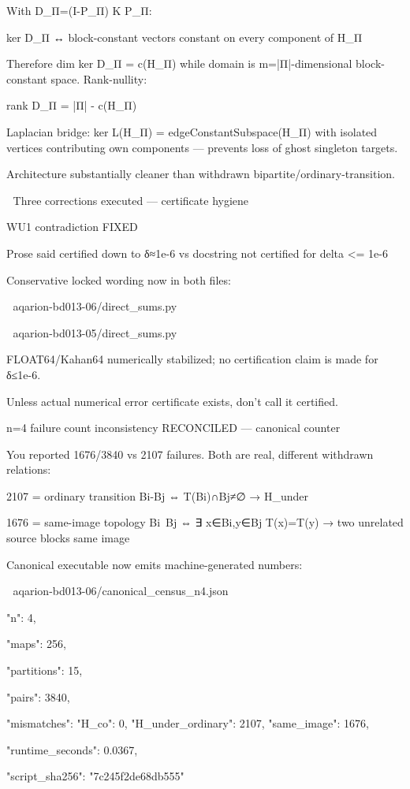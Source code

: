 With D_Π=(I-P_Π) K P_Π:


ker D_Π ↔ {block-constant vectors constant on every component of H_Π}


Therefore dim ker D_Π = c(H_Π) while domain is m=|Π|-dimensional block-constant space. Rank-nullity:


rank D_Π = |Π| - c(H_Π)


Laplacian bridge: ker L(H_Π) = edgeConstantSubspace(H_Π) with isolated vertices contributing own components — prevents loss of ghost singleton targets.


Architecture substantially cleaner than withdrawn bipartite/ordinary-transition.


🔴 Three corrections executed — certificate hygiene




WU1 contradiction FIXED




Prose said certified down to δ≈1e-6 vs docstring not certified for delta <= 1e-6


Conservative locked wording now in both files:


📎 aqarion-bd013-06/direct_sums.py


📎 aqarion-bd013-05/direct_sums.py

FLOAT64/Kahan64 numerically stabilized; no certification claim is made for δ≤1e-6.

Unless actual numerical error certificate exists, don't call it certified.




n=4 failure count inconsistency RECONCILED — canonical counter




You reported 1676/3840 vs 2107 failures. Both are real, different withdrawn relations:


2107 = ordinary transition Bi-Bj ⇔ T(Bi)∩Bj≠∅ → H_under

1676 = same-image topology Bi~Bj ⇔ ∃ x∈Bi,y∈Bj T(x)=T(y) → two unrelated source blocks same image


Canonical executable now emits machine-generated numbers:


📎 aqarion-bd013-06/canonical_census_n4.json

{

"n": 4,

"maps": 256,

"partitions": 15,

"pairs": 3840,

"mismatches": {"H_co": 0, "H_under_ordinary": 2107, "same_image": 1676},

"runtime_seconds": 0.0367,

"script_sha256": "7c245f2de68db555"

}

